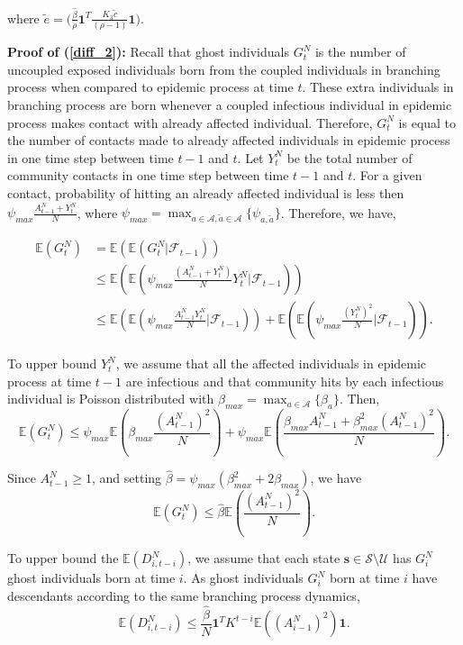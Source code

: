 \documentclass{article}
\theoremstyle{definition}
\newcommand{\lrp}[1]{\left({#1}\right)}
\newcommand{\Exp}[1]{\mathbb{E}\lrp{#1}}
\begin{document}
    where $\tilde{e} = \bigg(\frac{\hat{\beta}}{ \rho} \bm{1}^T    \frac{K_3 \tilde{c}}{(\rho -1)}  \bm{1}\bigg)$.




 
\textbf{Proof of (\ref{diff_2}):} Recall that ghost individuals $G_t^N$ is the number of uncoupled exposed individuals born from the coupled individuals in branching process when compared to epidemic process at time $t$. These extra individuals in branching process are born whenever a coupled infectious individual in epidemic process makes contact with already affected individual.
Therefore, $G^N_t$ is equal to the number of contacts made to already affected individuals in epidemic process in one time step between time $t-1$ and $t$. Let ${Y}_t^N$ be the total number of community contacts in one time step between time $t-1$ and $t$. For a given contact, probability of hitting an already affected individual is less then $\psi_{max} \frac{A^N_{t-1}+{Y}_t^N}{N}$, where $\psi_{max} = \max_{a\in \mathcal A, \tilde{a}\in\mathcal A}\{\psi_{a,\tilde{a}}\}$. Therefore, we have,

\begin{equation*}
    \begin{aligned}
    \Exp{{G}^N_t} &= \Exp{\Exp{{G}^N_t | \mathcal{F}_{t-1}} } \\
    & \leq \Exp{\Exp{\psi_{max} \frac{(A_{t-1}^N+{Y}_t^N)}{N} {Y}_t^N |\mathcal{F}_{t-1}}} \\
    & \leq \Exp{\Exp{\psi_{max} \frac{A_{t-1}^N{Y}_t^N}{N} |\mathcal{F}_{t-1}}} + \Exp{\Exp{ \psi_{max} \frac{({Y}_t^N)^2}{N} |\mathcal{F}_{t-1}}}. 
    \end{aligned}
\end{equation*}

To upper bound ${Y}_t^N$, we assume that all the affected individuals in epidemic process at time $t-1$ are infectious and that community hits by each infectious individual is Poisson distributed with $\beta_{max} = \max_{a\in \mathcal A}\{\beta_{a}\}$. Then,
\[\Exp{{G}^N_t} \leq \psi_{max}\Exp{ \beta_{max}\frac{(A_{t-1}^N)^2}{N} } + \psi_{max} \Exp{\frac{\beta_{max} A_{t-1}^N+\beta_{max}^2 (A_{t-1}^N)^2}{N} }. \]



Since $A_{t-1}^N\geq 1$, and setting $\hat{\beta}=\psi_{max}(\beta_{max}^2+2\beta_{max})$, we have
\[\Exp{{G}^N_t} \leq \hat{\beta} \Exp{ \frac{(A_{t-1}^N)^2}{N} }. \]

 To upper bound the $\Exp{D_{i,t-i}^N}$, we assume that each state $\bm{s} \in \mathcal S \setminus  \mathcal U $ has $G_i^N$ ghost individuals born at time $i$. As ghost individuals $G_i^N$ born at time $i$ have descendants according to the same branching process dynamics, 
\begin{equation*} \Exp{D_{i,t-i}^N} \le \frac{\hat{\beta}}{N} \bm{1}^T  {K}^{t-i} \Exp{(A_{i-1}^N)^2 }\bm{1}. 
 \end{equation*}
\end{document}
